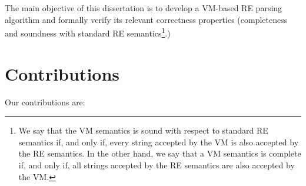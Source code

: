 \documentclass[oneside,12pt]{scrbook}
\theoremstyle{definition}
\theoremstyle{plain}
\theoremstyle{definition}
\begin{document}
The main objective of this dissertation is to develop a VM-based RE parsing algorithm and formally verify its relevant correctness properties (completeness and soundness with standard RE semantics\footnote{We say that the VM semantics is sound with respect to standard RE semantics if, and only if, every string accepted by the VM is also accepted by the RE semantics. In the other hand, we say that a VM semantics is complete if, and only if, all strings accepted by the RE semantics are also accepted by the VM.}.) %

\section{Contributions}\label{section:contributions}
Our contributions are:
\end{document}
